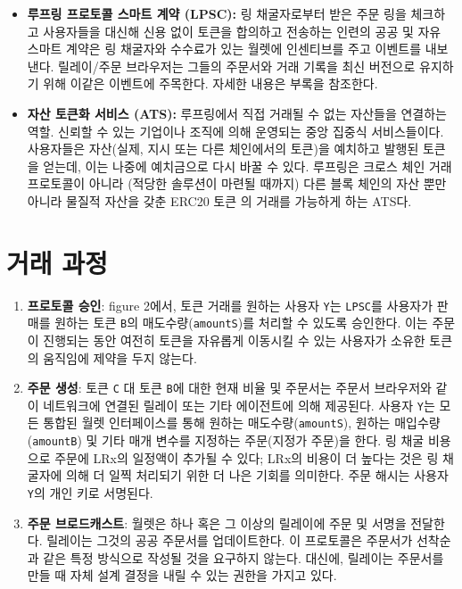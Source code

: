\documentclass{article}
\begin{document}
\begin{multicols}{2}
\begin{itemize}
	\item \textbf{루프링 프로토콜 스마트 계약 (LPSC):} 링 채굴자로부터 받은 주문 링을 체크하고 사용자들을 대신해 신용 없이 토큰을 합의하고 전송하는 인련의 공공 및 자유 스마트 계약은 링 채굴자와 수수료가 있는 월렛에 인센티브를 주고 이벤트를 내보낸다. 릴레이/주문 브라우저는 그들의 주문서와 거래 기록을 최신 버전으로 유지하기 위해 이같은 이벤트에 주목한다. 자세한 내용은 부록을 참조한다.

	\item \textbf{자산 토큰화 서비스 (ATS):} 루프링에서 직접 거래될 수 없는 자산들을 연결하는 역할. 신뢰할 수 있는 기업이나 조직에 의해 운영되는 중앙 집중식 서비스들이다. 사용자들은 자산(실제, 지시 또는 다른 체인에서의 토큰)을 예치하고 발행된 토큰을 얻는데, 이는 나중에 예치금으로 다시 바꿀 수 있다. 루프링은 크로스 체인 거래 프로토콜이 아니라 (적당한 솔루션이 마련될 때까지) 다른 블록 체인의 자산 뿐만아니라 물질적 자산을 갖춘 ERC20 토큰 \cite{ERC20}의 거래를 가능하게 하는 ATS다.

\end{itemize}



\section{거래 과정\label{sec:process}}

\begin{enumerate} 
	
	\item \textbf{프로토콜 승인}: figure 2에서, 토큰 거래를 원하는 사용자 \verb|Y|는 \verb|LPSC|를 사용자가 판매를 원하는 토큰 \verb|B|의 매도수량(\verb|amountS|)를 처리할 수 있도록 승인한다. 이는 주문이 진행되는 동안 여전히 토큰을 자유롭게 이동시킬 수 있는 사용자가 소유한 토큰의 움직임에 제약을 두지 않는다.
	
	\item \textbf{주문 생성}: 토큰 \verb|C| 대 토큰 \verb|B|에 대한 현재 비율 및 주문서는 주문서 브라우저와 같이 네트워크에 연결된 릴레이 또는 기타 에이전트에 의해 제공된다. 사용자 \verb|Y|는 모든 통합된 월렛 인터페이스를 통해 원하는 매도수량(\verb|amountS|), 원하는 매입수량(\verb|amountB|) 및 기타 매개 변수를 지정하는 주문(지정가 주문)을 한다. 링 채굴 비용으로 주문에 LRx의 일정액이 추가될 수 있다; LRx의 비용이 더 높다는 것은 링 채굴자에 의해 더 일찍 처리되기 위한 더 나은 기회를 의미한다. 주문 해시는 사용자 \verb|Y|의 개인 키로 서명된다.
	
    \item \textbf{주문 브로드캐스트}: 월렛은 하나 혹은 그 이상의 릴레이에 주문 및 서명을 전달한다. 릴레이는 그것의 공공 주문서를 업데이트한다. 이 프로토콜은 주문서가 선착순과 같은 특정 방식으로 작성될 것을 요구하지 않는다. 대신에, 릴레이는 주문서를 만들 때 자체 설계 결정을 내릴 수 있는 권한을 가지고 있다. 
    

\end{enumerate}
\end{multicols}
\end{document}
